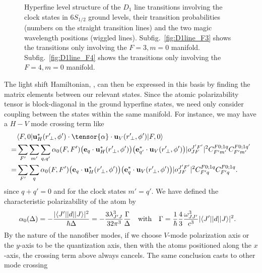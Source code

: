 \documentclass[preprint,aps,pra,onecolumn]{revtex4-1} %
\begin{document}
\begin{figure}
\begin{minipage}{.49\linewidth}
\end{minipage}
\caption{Hyperfine level structure of the $ D_1 $ line transitions involving the clock states in $ 6S_{1/2} $ ground levels, their transition probabilities (numbers on the straight transition lines) and the two magic wavelength positions (wiggled lines). 
Subfig.~\ref{fig:D1line_F3} shows the transitions only involving the $ F=3,m=0 $ manifold. Subfig.~\ref{fig:D1line_F4} shows the transitions only involving the $ F=4,m=0 $ manifold.  }
\label{fig:D1line}
\end{figure}

The light shift Hamiltonian, , can then be expressed in this basis by finding the matrix elements between our relevant states. 
Since the atomic polarizability tensor is block-diagonal in 
the ground hyperfine states, we need only consider coupling between the states within the same 
manifold.  
For instance, we may have a $H-V$ mode crossing term like
\begin{align} \label{eq:ClockMatrixElement}
	&\bra{F,0} \mathbf{u}^*_H(r^\prime\!_\perp, \phi') \cdot \tensor{\alpha} \cdot 
	\mathbf{u}_{V}(r^\prime\!_\perp, \phi') \ket{F,0}\nonumber\\
  =& 
	\sum_{F'} \sum_{m'} \sum_{q, q'} \alpha_0(F,F') \big( \mathbf{e}_q \cdot 
	\mathbf{u}^*_H(r^\prime\!_\perp, \phi') \big) 
	\big( \mathbf{e}^*_{q'} \cdot \mathbf{u}_V(r^\prime\!_\perp, \phi') \big) |o^{J'F'}_{JF} |^2 C^{F 0;1 
	q}_{F' m'} C^{F 
	0;1q'}_{F' m'} \\
 = & \sum_{F'} \sum_{q} \alpha_0(F,F') \big( \mathbf{e}_q \cdot \mathbf{u}^*_H(r^\prime\!_\perp, \phi') 
	\big) \big( 
	\mathbf{e}^*_{q} \cdot \mathbf{u}_V(r^\prime\!_\perp, \phi') \big) |o^{J'F'}_{JF} |^2 C^{F 0;1q}_{F' q} 
	C^{F 0;1q}_{F' q}.
\end{align}
since $q+q' = 0$ and for the clock states $m' = q'$. We have defined the characteristic polarizability of the atom by
\begin{align} \label{Eq::alpha0}
\alpha_0(\Delta) & =  -\frac{|  \langle{ J' }\rvert| d | \lvert{ J }\rangle |^2}{\hbar \Delta } = - \frac{3 \lambda_{J' J}^3}{32 \pi^3} \frac{ \Gamma }{ \Delta }\quad \text{with}\quad 
\Gamma = \frac{1}{\hbar} \frac{4}{3} \frac{\omega_{J J'}^3}{c^3} | \langle{ J' }\rvert| d | \lvert{ J }\rangle |^2.
\end{align}
By the nature of the nanofiber modes, if we choose 
$V$-mode polarization axis or the $y$-axis to be the quantization axis, then with the atoms positioned 
along the $x$-axis, the crossing term above always cancels. The same conclusion casts to other mode crossing 
\end{document}
